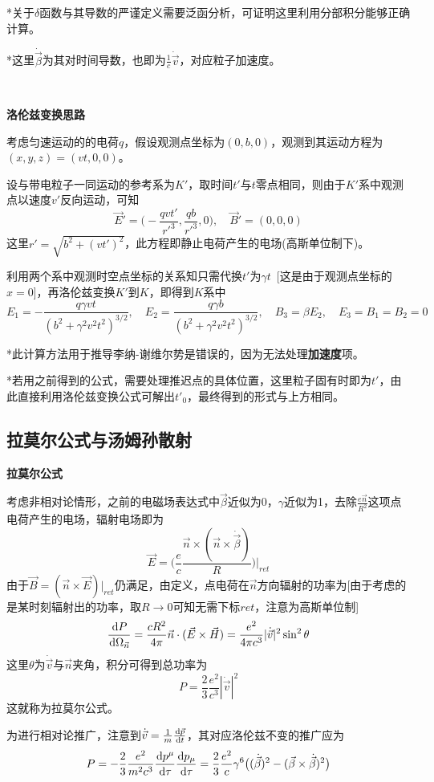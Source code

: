\documentclass[a4paper,UTF8,fontset=windows]{ctexart}
\newcommand*{\dr}{\hspace{0.07em}\mathrm{d}}
\newcommand*{\vb}{\vec{B}}
\newcommand*{\ve}{\vec{E}}
\newcommand*{\vh}{\vec{H}}
\newcommand*{\vns}{\vec{n}}
\newcommand*{\vps}{\vec{p}}
\newcommand*{\vvs}{\vec{v}}
\newcommand*{\vbeta}{\vec{\beta}}
\newcommand*{\dt}[2][t]{\frac{\dr #2}{\dr #1}}
\begin{document}
*关于$\delta$函数与其导数的严谨定义需要泛函分析，可证明这里利用分部积分能够正确计算。

*这里$\dot{\vbeta}$为其对时间导数，也即为$\frac{1}{c}\dot{\vvs}$，对应粒子加速度。

\

\textbf{洛伦兹变换思路}

考虑匀速运动的的电荷$q$，假设观测点坐标为$(0,b,0)$，观测到其运动方程为$(x,y,z)=(vt,0,0)$。

设与带电粒子一同运动的参考系为$K'$，取时间$t'$与$t$零点相同，则由于$K'$系中观测点以速度$v'$反向运动，可知
$$\ve'=\bigg(-\frac{qvt'}{{r'}^3},\frac{qb}{{r'}^3},0\bigg),\quad\vb'=(0,0,0)$$
这里$r'=\sqrt{b^2+(vt')^2}$，此方程即静止电荷产生的电场(高斯单位制下)。

利用两个系中观测时空点坐标的关系知只需代换$t'$为$\gamma t$\ [这是由于观测点坐标的$x=0$]，再洛伦兹变换$K'$到$K$，即得到$K$系中
$$E_1=-\frac{q\gamma vt}{(b^2+\gamma^2v^2t^2)^{3/2}},\quad E_2=\frac{q\gamma b}{(b^2+\gamma^2v^2t^2)^{3/2}},\quad B_3=\beta E_2,\quad E_3=B_1=B_2=0$$

*此计算方法用于推导李纳-谢维尔势是错误的，因为无法处理\textbf{加速度}项。

*若用之前得到的公式，需要处理推迟点的具体位置，这里粒子固有时即为$t'$，由此直接利用洛伦兹变换公式可解出$t'_0$，最终得到的形式与上方相同。

\subsection{拉莫尔公式与汤姆孙散射}
\textbf{拉莫尔公式}

考虑非相对论情形，之前的电磁场表达式中$\vbeta$近似为0，$\gamma$近似为1，去除$\frac{e\vns}{R^2}$这项点电荷产生的电场，辐射电场即为
$$\ve=\bigg(\frac{e}{c}\frac{\vns\times(\vns\times\dot{\vbeta})}{R}\bigg)\bigg|_{ret}$$
由于$\vb=(\vns\times\ve)\big|_{ret}$仍满足，由定义，点电荷在$\vns$方向辐射的功率为[由于考虑的是某时刻辐射出的功率，取$R\to0$可知无需下标$ret$，注意为高斯单位制]
$$\dt[\Omega_{\vns}]{P}=\frac{cR^2}{4\pi}\vns\cdot(\ve\times\vh)=\frac{e^2}{4\pi c^3}|\dot{\vvs}|^2\sin^2\theta$$
这里$\theta$为$\dot{\vvs}$与$\vns$夹角，积分可得到总功率为
$$P=\frac{2}{3}\frac{e^2}{c^3}|\dot{\vvs}|^2$$
这就称为拉莫尔公式。

为进行相对论推广，注意到$\dot{\vvs}=\frac{1}{m}\dt{\vps}$，其对应洛伦兹不变的推广应为
$$P=-\frac{2}{3}\frac{e^2}{m^2c^3}\dt[\tau]{p^\mu}\dt[\tau]{p_\mu}=\frac{2}{3}\frac{e^2}{c}\gamma^6\big((\dot{\vbeta})^2-(\vbeta\times\dot{\vbeta})^2\big)$$
\end{document}
